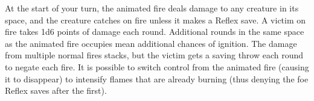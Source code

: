 {	At the start of your turn, the animated fire deals damage to any creature in its space, and the creature catches on fire unless it makes a Reflex save. A victim on fire takes 1d6 points of damage each round. Additional rounds in the same space as the animated fire occupies mean additional chances of ignition. The damage from multiple normal fires stacks, but the victim gets a saving throw each round to negate each fire. It is possible to switch control from the animated fire (causing it to disappear) to intensify flames that are already burning (thus denying the foe Reflex saves after the first).
}